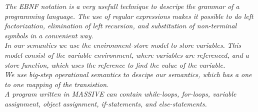 \vspace{30pt}

\textit{The EBNF notation is a very usefull technique to descripe the grammar of a programming language. The use of regular expressions makes it possible to do left factorization, elimination of left recursion, and substitution of non-terminal symbols in a convenient way.\\ \indent
In our semantics we use the environment-store model to store variables. This model consist of the variable environment, where variables are referenced, and a store function, which uses the reference to find the value of the variable.\\ \indent
We use big-step operational semantics to descipe our semantics, which has a one to one mapping of the transistion.\\ \indent
A program written in MASSIVE can contain while-loops, for-loops, variable assignment, object assignment, if-statements, and else-statements.}